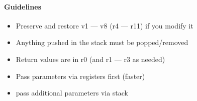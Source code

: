     \paragraph{Guidelines}
    \begin{itemize}
      \item Preserve and restore v1 --- v8 (r4 --- r11) if you modify it
      \item Anything pushed in the stack must be popped/removed
      \item Return values are in r0 (and r1 --- r3 as needed)
      \item Pass parameters via registers first (faster)
      \item pass additional parameters via stack
    \end{itemize}
